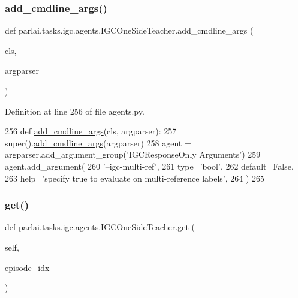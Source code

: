 \subsubsection{\texorpdfstring{add\+\_\+cmdline\+\_\+args()}{add\_cmdline\_args()}}
{\footnotesize\ttfamily def parlai.\+tasks.\+igc.\+agents.\+I\+G\+C\+One\+Side\+Teacher.\+add\+\_\+cmdline\+\_\+args (\begin{DoxyParamCaption}\item[{}]{cls,  }\item[{}]{argparser }\end{DoxyParamCaption})}



Definition at line 256 of file agents.\+py.


\begin{DoxyCode}
256     \textcolor{keyword}{def }\hyperlink{namespaceparlai_1_1agents_1_1drqa_1_1config_a62fdd5554f1da6be0cba185271058320}{add\_cmdline\_args}(cls, argparser):
257         super().\hyperlink{namespaceparlai_1_1agents_1_1drqa_1_1config_a62fdd5554f1da6be0cba185271058320}{add\_cmdline\_args}(argparser)
258         agent = argparser.add\_argument\_group(\textcolor{stringliteral}{'IGCResponseOnly Arguments'})
259         agent.add\_argument(
260             \textcolor{stringliteral}{'--igc-multi-ref'},
261             type=\textcolor{stringliteral}{'bool'},
262             default=\textcolor{keyword}{False},
263             help=\textcolor{stringliteral}{'specify true to evaluate on multi-reference labels'},
264         )
265 
\end{DoxyCode}
\mbox{\label{classparlai_1_1tasks_1_1igc_1_1agents_1_1IGCOneSideTeacher_a90c812fb4446f6752e6917246aeee93a}} 
\subsubsection{\texorpdfstring{get()}{get()}}
{\footnotesize\ttfamily def parlai.\+tasks.\+igc.\+agents.\+I\+G\+C\+One\+Side\+Teacher.\+get (\begin{DoxyParamCaption}\item[{}]{self,  }\item[{}]{episode\+\_\+idx }\end{DoxyParamCaption})}



